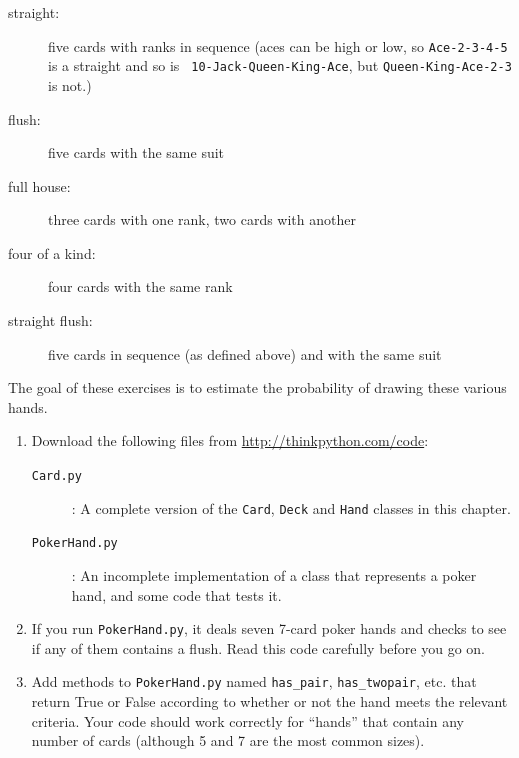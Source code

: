 \documentclass[10pt]{book}
\begin{document}
\begin{CJK}{UTF8}{gbsn}
\begin{exercise}
\begin{description}
\item[straight:] five cards with ranks in sequence (aces can
be high or low, so {\tt Ace-2-3-4-5} is a straight and so is {\tt
10-Jack-Queen-King-Ace}, but {\tt Queen-King-Ace-2-3} is not.)
\vspace{-0.05in}

\item[flush:] five cards with the same suit
\vspace{-0.05in}

\item[full house:] three cards with one rank, two cards with another
\vspace{-0.05in}

\item[four of a kind:] four cards with the same rank
\vspace{-0.05in}

\item[straight flush:] five cards in sequence (as defined above) and
with the same suit
\vspace{-0.05in}

\end{description}
%
The goal of these exercises is to estimate
the probability of drawing these various hands.

\begin{enumerate}

\item Download the following files from \url{http://thinkpython.com/code}:

\begin{description}

\item[{\tt Card.py}]: A complete version of the {\tt Card},
{\tt Deck} and {\tt Hand} classes in this chapter.

\item[{\tt PokerHand.py}]: An incomplete implementation of a class
that represents a poker hand, and some code that tests it.

\end{description}
%
\item If you run {\tt PokerHand.py}, it deals seven 7-card poker hands
and checks to see if any of them contains a flush.  Read this
code carefully before you go on.

\item Add methods to {\tt PokerHand.py} named \verb"has_pair",
\verb"has_twopair", etc. that return True or False according to
whether or not the hand meets the relevant criteria.  Your code should
work correctly for ``hands'' that contain any number of cards
(although 5 and 7 are the most common sizes).


\end{enumerate}
\end{exercise}
\end{CJK}
\end{document}
